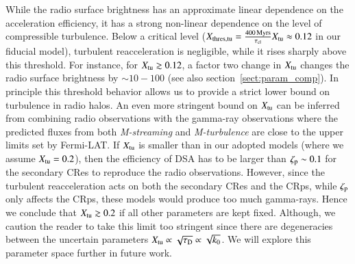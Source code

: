 \documentclass[a4paper,fleqn,usenatbib]{mnras}
\newcommand{\Mstream}{{\it M-streaming}\xspace}
\newcommand{\Mflatturb}{{\it M-turbulence}\xspace}
\begin{document}
While the radio surface brightness has an approximate linear
dependence on the acceleration efficiency, it has a strong non-linear
dependence on the level of compressible turbulence. Below a critical
level ($X_{\mathrm{thres,tu}} = \frac{400\,{\mathrm{Myrs}}}{\tau_{\mathrm{cl}}}
X_{\mathrm{tu}}\approx 0.12$ in our fiducial model), turbulent
reacceleration is negligible, while it rises sharply above this
threshold. For instance, for $X_{\mathrm{tu}}\gtrsim0.12$, a factor two
change in $X_{\mathrm{tu}}$ changes the radio surface brightness by $\sim
10-100$ (see also section~\ref{sect:param_comp}). In principle this
threshold behavior allows us to provide a strict lower bound on
turbulence in radio halos. An even more stringent bound on
$X_{\mathrm{tu}}$ can be inferred from combining radio observations with
the gamma-ray observations where the predicted fluxes from both
\Mstream and \Mflatturb are close to the upper limits set by
Fermi-LAT. If $X_{\mathrm{tu}}$ is smaller than in our adopted models
(where we assume $X_{\mathrm{tu}}=0.2$), then the efficiency of DSA has to
be larger than $\zeta_{\mathrm{p}}\sim 0.1$ for the secondary CRes to
reproduce the radio observations. However, since the turbulent
reacceleration acts on both the secondary CRes and the CRps, while
$\zeta_{\mathrm{p}}$ only affects the CRps, these models would produce too
much gamma-rays. Hence we conclude that $X_{\mathrm{tu}}\gtrsim0.2$ if all
other parameters are kept fixed. Although, we caution the reader to
take this limit too stringent since there are degeneracies between the
uncertain parameters $X_{\mathrm{tu}}\propto\sqrt{\tau_{\mathrm{D}}}\propto
\sqrt{k_0}$. We will explore this parameter space further in future
work.
\end{document}
